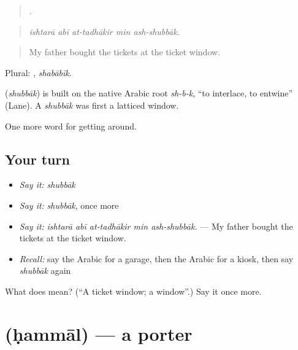 \begin{quote}
    .
\end{quote}

\begin{quote}
\emph{ishtarā abī at-tadhākir min ash-shubbāk.}
\end{quote}

\begin{quote}
My father bought the tickets at the ticket window.
\end{quote}

Plural: , \emph{shabābīk}.

\begin{cousinweb}
\textbf{} (\emph{shubbāk}) is built on the native Arabic root \emph{sh-b-k}, \textquotedblleft{}to interlace, to entwine\textquotedblright{} (Lane). A \emph{shubbāk} was first a latticed window.
\end{cousinweb}

\begin{grammarlens}[title={What you've built}]
One more word for getting around.
\end{grammarlens}

\subsection*{Your turn}
\begin{itemize}
\raggedright
  \item \emph{Say it:} \emph{shubbāk}
  \item \emph{Say it:} \emph{shubbāk}, once more
  \item \emph{Say it:} \emph{ishtarā abī at-tadhākir min ash-shubbāk.} — My father bought the tickets at the ticket window.
  \item \emph{Recall:} say the Arabic for a garage, then the Arabic for a kiosk, then say \emph{shubbāk} again
\end{itemize}

\begin{tcolorbox}[breakable,colback=teal!4,colframe=teal!35!black,title={Before you move on}]
What does  mean? (\textquotedblleft{}A ticket window; a window\textquotedblright{}.) Say it once more.
\end{tcolorbox}
\section[\texorpdfstring{\ar{حمال} (ḥammāl)}{حمال (ḥammāl)}]{ (ḥammāl) — a porter}

